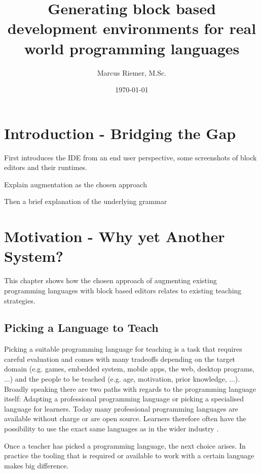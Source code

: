 \documentclass[]{report}
\title{Generating block based development environments for real world programming languages}
\author{Marcus Riemer, M.Sc.}
\date{\today}
\begin{document}
\maketitle

\newpage

\tableofcontents

\chapter{Introduction - Bridging the Gap}
\label{sec:introduction-bridging-the-gap}

First introduces the IDE from an end user perspective, some screenshots of block editors and their runtimes.

Explain augmentation as the chosen approach

Then a brief explanation of the underlying grammar

\chapter{Motivation - Why yet Another System?}
\label{sec:motivation}

This chapter shows how the chosen approach of augmenting existing programming languages with block based editors relates to existing teaching strategies.

\section{Picking a Language to Teach}

Picking a suitable programming language for teaching is a task that requires careful evaluation and comes with many tradeoffs depending on the target domain (e.g. games, embedded system, mobile apps, the web, desktop programs, ...) and the people to be teached (e.g. age, motivation, prior knowledge, ...). Broadly speaking there are two paths with regards to the programming language itself: Adapting a professional programming language or picking a specialised language for learners. Today many professional programming languages are available without charge or are open source. Learners therefore often have the possibility to use the exact same languages as in the wider industry .

Once a teacher has picked a programming language, the next choice arises. In practice the tooling that is required or available to work with a certain language makes big difference. 
\end{document}
